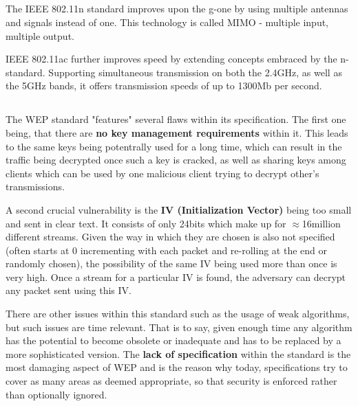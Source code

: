 \documentclass[12pt]{article}
\newcommand{\exercise}{\subsection{}\setcounter{subsubsection}{0}}
\begin{document}
\exercise
The IEEE 802.11n standard improves upon the g-one by using multiple antennas and signals instead of one. This technology is called MIMO - multiple input, multiple output.

IEEE 802.11ac further improves speed by extending concepts embraced by the n-standard. Supporting simultaneous transmission on both the 2.4GHz, as well as the 5GHz bands, it offers transmission speeds of up to 1300Mb per second.

\exercise
The WEP standard "features" several flaws within its specification.
The first one being, that there are \textbf{no key management requirements} within it. This leads to the same keys being potentrally used for a long time, which can result in the traffic being decrypted once such a key is cracked, as well as sharing keys among clients which can be used by one malicious client trying to decrypt other's transmissions.

A second crucial vulnerability is the \textbf{IV (Initialization Vector)} being too small and sent in clear text. It consists of only 24bits which make up for $\approx$16million different streams. Given the way in which they are chosen is also not specified (often starts at 0 incrementing with each packet and re-rolling at the end or randomly chosen), the possibility of the same IV being used more than once is very high. Once a stream for a particular IV is found, the adversary can decrypt any packet sent using this IV.

There are other issues within this standard such as the usage of weak algorithms, but such issues are time relevant. That is to say, given enough time any algorithm has the potential to become obsolete or inadequate and has to be replaced by a more sophisticated version. The \textbf{lack of specification} within the standard is the most damaging aspect of WEP and is the reason why today, specifications try to cover as many areas as deemed appropriate, so that security is enforced rather than optionally ignored.
\end{document}
